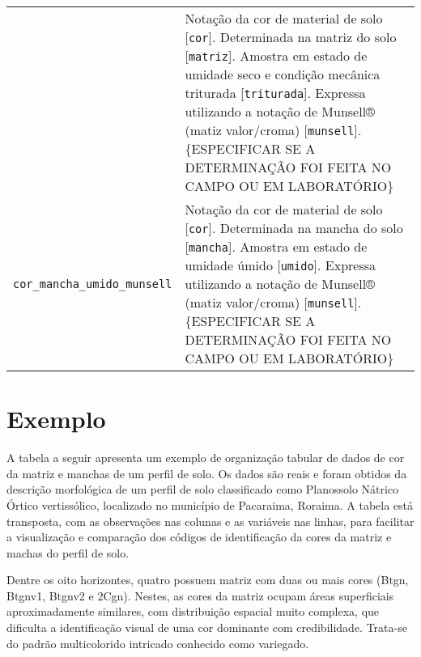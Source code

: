 \documentclass[
]{book}
\begin{document}
\begin{longtable}[]{@{}ll@{}}
\begin{minipage}[t]{0.51\columnwidth}
\end{minipage} & \begin{minipage}[t]{0.43\columnwidth}\raggedright
Notação da cor de material de solo {[}\texttt{cor}{]}. Determinada na matriz do solo {[}\texttt{matriz}{]}. Amostra em estado de umidade seco e condição mecânica triturada {[}\texttt{triturada}{]}. Expressa utilizando a notação de Munsell® (matiz valor/croma) {[}\texttt{munsell}{]}. \{ESPECIFICAR SE A DETERMINAÇÃO FOI FEITA NO CAMPO OU EM LABORATÓRIO\}\strut
\end{minipage}\tabularnewline
\begin{minipage}[t]{0.51\columnwidth}\raggedright
\texttt{cor\_mancha\_umido\_munsell}\strut
\end{minipage} & \begin{minipage}[t]{0.43\columnwidth}\raggedright
Notação da cor de material de solo {[}\texttt{cor}{]}. Determinada na mancha do solo {[}\texttt{mancha}{]}. Amostra em estado de umidade úmido {[}\texttt{umido}{]}. Expressa utilizando a notação de Munsell® (matiz valor/croma) {[}\texttt{munsell}{]}. \{ESPECIFICAR SE A DETERMINAÇÃO FOI FEITA NO CAMPO OU EM LABORATÓRIO\}\strut
\end{minipage}\tabularnewline
\bottomrule
\end{longtable}

\hypertarget{exemplo}{%
\section{Exemplo}\label{exemplo}}

A tabela a seguir apresenta um exemplo de organização tabular de dados de cor da matriz e manchas de um perfil de solo. Os dados são reais e foram obtidos da descrição morfológica de um perfil de solo classificado como Planossolo Nátrico Órtico vertissólico, localizado no município de Pacaraima, Roraima\citep{OliveiraEtAl2018b}. A tabela está transposta, com as observações nas colunas e as variáveis nas linhas, para facilitar a visualização e comparação dos códigos de identificação da cores da matriz e machas do perfil de solo.

Dentre os oito horizontes, quatro possuem matriz com duas ou mais cores (Btgn, Btgnv1, Btgnv2 e 2Cgn). Nestes, as cores da matriz ocupam áreas superficiais aproximadamente similares, com distribuição espacial muito complexa, que dificulta a identificação visual de uma cor dominante com credibilidade. Trata-se do padrão multicolorido intricado conhecido como variegado.
\end{document}
